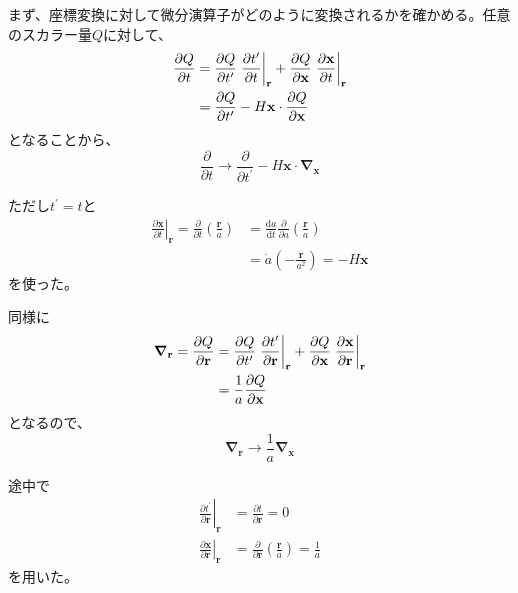 \documentclass[a4paper,papersize,uplatex,dvipdfmx,10pt]{jsarticle}
\begin{document}
まず、座標変換に対して微分演算子がどのように変換されるかを確かめる。任意のスカラー量$Q$に対して、
\begin{align}
  \frac{\partial Q}{\partial t} &= \frac{\partial Q}{\partial t^{\prime}}\left.\frac{\partial t^{\prime}}{\partial t}\right|_{\mathbf{r}} + \frac{\partial Q}{\partial \mathbf{x}}\left.\frac{\partial \mathbf{x}}{\partial t}\right|_{\mathbf{r}}\notag\\
  &= \frac{\partial Q}{\partial t^{\prime}} - H\mathbf{x}\cdot\frac{\partial Q}{\partial \mathbf{x}}
\end{align}
となることから、
\begin{equation}
  \frac{\partial}{\partial t} \to \frac{\partial}{\partial t^{\prime}} - H\mathbf{x}\cdot\bm{\nabla}_{\mathbf{x}}
\end{equation}

ただし$t^{\prime}=t$と
\begin{align*}
  \left.\frac{\partial \mathbf{x}}{\partial t}\right|_{\mathbf{r}} = \frac{\partial}{\partial t}\left( \frac{\mathbf{r}}{a} \right) &= \frac{\mathrm{d}a}{\mathrm{d}t}\frac{\partial}{\partial a}\left( \frac{\mathbf{r}}{a} \right)\\
  &= \dot{a}\left( -\frac{\mathbf{r}}{a^{2}} \right) = -H\mathbf{x}
\end{align*}
を使った。

同様に
\begin{align}
  \bm{\nabla}_{\mathbf{r}} = \frac{\partial Q}{\partial \mathbf{r}} &= \frac{\partial Q}{\partial t^{\prime}}\left.\frac{\partial t^{\prime}}{\partial \mathbf{r}} \right|_{\mathbf{r}} + \frac{\partial Q}{\partial \mathbf{x}}\left.\frac{\partial \mathbf{x}}{\partial \mathbf{r}}\right|_{\mathbf{r}}\notag\\
  &= \frac{1}{a}\frac{\partial Q}{\partial \mathbf{x}}
\end{align}
となるので、
\begin{equation}
  \bm{\nabla}_{\mathbf{r}} \to \frac{1}{a}\bm{\nabla}_{\mathbf{x}}
\end{equation}

途中で
\begin{align*}
  \left.\frac{\partial t^{\prime}}{\partial \mathbf{r}} \right|_{\mathbf{r}} &= \frac{\partial t}{\partial \mathbf{r}} = 0\\
  \left.\frac{\partial \mathbf{x}}{\partial \mathbf{r}}\right|_{\mathbf{r}} &= \frac{\partial}{\partial \mathbf{r}}\left( \frac{\mathbf{r}}{a} \right) = \frac{1}{a}
\end{align*}
を用いた。
\end{document}
